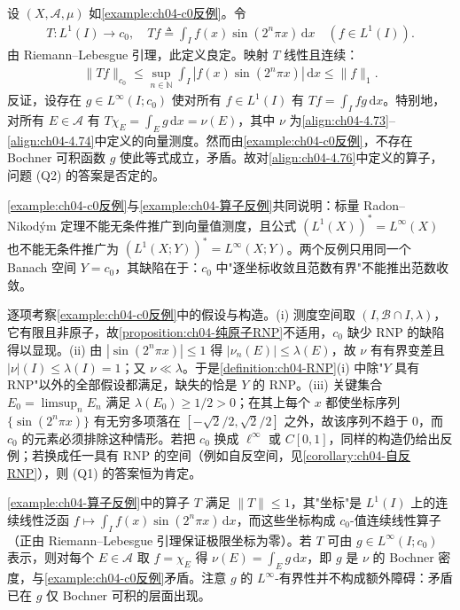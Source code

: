 \documentclass[../../main.tex]{subfiles}%
\begin{document}
\begin{example}\label{example:ch04-算子反例}
设 $(X,\mathcal{A},\mu)$ 如\cref{example:ch04-c0反例}。令
\begin{align}
T:L^1(I)\to c_0,\quad Tf\triangleq \int_I f(x)\sin(2^n\pi x)\,\mathrm{d}x\quad(f\in L^1(I)). \label{align:ch04-4.76}
\end{align}
由 Riemann--Lebesgue 引理，此定义良定。映射 $T$ 线性且连续：
\begin{align*}
\|Tf\|_{c_0}\leqslant\sup_{n\in\mathbb{N}}\int_I|f(x)\sin(2^n\pi x)|\,\mathrm{d}x\leqslant\|f\|_1.
\end{align*}
反证，设存在 $g\in L^\infty(I;c_0)$ 使对所有 $f\in L^1(I)$ 有 $Tf=\int_I fg\,\mathrm{d}x$。特别地，对所有 $E\in\mathcal{A}$ 有 $T\chi_E=\int_E g\,\mathrm{d}x=\nu(E)$，其中 $\nu$ 为\eqref{align:ch04-4.73}--\eqref{align:ch04-4.74}中定义的向量测度。然而由\cref{example:ch04-c0反例}，不存在 Bochner 可积函数 $g$ 使此等式成立，矛盾。故对\eqref{align:ch04-4.76}中定义的算子，问题 (Q2) 的答案是否定的。
\end{example}

\begin{remark}\label{remark:ch04-c0反例意义}
\cref{example:ch04-c0反例}与\cref{example:ch04-算子反例}共同说明：标量 Radon--Nikodým 定理不能无条件推广到向量值测度，且公式 $(L^1(X))^*=L^\infty(X)$ 也不能无条件推广为 $(L^1(X;Y))^*=L^\infty(X;Y)$。两个反例只用同一个 Banach 空间 $Y=c_0$，其缺陷在于：$c_0$ 中"逐坐标收敛且范数有界"不能推出范数收敛。

逐项考察\cref{example:ch04-c0反例}中的假设与构造。(i) 测度空间取 $(I,\mathcal{B}\cap I,\lambda)$，它有限且非原子，故\cref{proposition:ch04-纯原子RNP}不适用，$c_0$ 缺少 RNP 的缺陷得以显现。(ii) 由 $|\sin(2^n\pi x)|\leqslant1$ 得 $|\nu_n(E)|\leqslant\lambda(E)$，故 $\nu$ 有有界变差且 $|\nu|(I)\leqslant\lambda(I)=1$；又 $\nu\ll\lambda$。于是\cref{definition:ch04-RNP}(i) 中除"$Y$ 具有 RNP"以外的全部假设都满足，缺失的恰是 $Y$ 的 RNP。(iii) 关键集合 $E_0=\limsup_nE_n$ 满足 $\lambda(E_0)\geqslant1/2>0$；在其上每个 $x$ 都使坐标序列 $\{\sin(2^n\pi x)\}$ 有无穷多项落在 $[-\sqrt2/2,\sqrt2/2]$ 之外，故该序列不趋于 $0$，而 $c_0$ 的元素必须排除这种情形。若把 $c_0$ 换成 $\ell^\infty$ 或 $C[0,1]$，同样的构造仍给出反例；若换成任一具有 RNP 的空间（例如自反空间，见\cref{corollary:ch04-自反RNP}），则 (Q1) 的答案恒为肯定。

\cref{example:ch04-算子反例}中的算子 $T$ 满足 $\|T\|\leqslant1$，其"坐标"是 $L^1(I)$ 上的连续线性泛函 $f\mapsto\int_I f(x)\sin(2^n\pi x)\,\mathrm{d}x$，而这些坐标构成 $c_0$-值连续线性算子（正由 Riemann--Lebesgue 引理保证极限坐标为零）。若 $T$ 可由 $g\in L^\infty(I;c_0)$ 表示，则对每个 $E\in\mathcal{A}$ 取 $f=\chi_E$ 得 $\nu(E)=\int_E g\,\mathrm{d}x$，即 $g$ 是 $\nu$ 的 Bochner 密度，与\cref{example:ch04-c0反例}矛盾。注意 $g$ 的 $L^\infty$-有界性并不构成额外障碍：矛盾已在 $g$ 仅 Bochner 可积的层面出现。
\end{remark}
\end{document}
